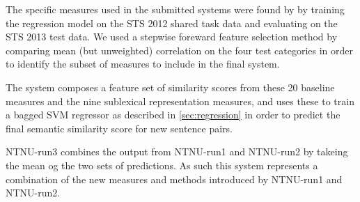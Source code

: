 
The specific measures used in the submitted systems were found by by training the regression model on the STS 2012 shared task data and evaluating on the STS 2013 test data. We used a stepwise foreward feature selection method by comparing mean (but unweighted) correlation on the four test categories in order to identify the subset of measures to include in the final system.

The system composes a feature set of similarity scores from these 20 baseline measures and the nine sublexical representation measures, and uses these to train a bagged SVM regressor as described in \ref{sec:regression} in order to predict the final semantic similarity score for new sentence pairs.

NTNU-run3 combines the output from NTNU-run1 and NTNU-run2 by takeing the mean og the two sets of predictions. As such this system represents a combination of the new measures and methods introduced by NTNU-run1 and NTNU-run2.


